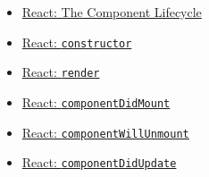 \begin{itemize}[leftmargin=*]
    \item \href{https://reactjs.org/docs/react-component.html#the-component-lifecycle}{React: The Component Lifecycle}
    \item \href{https://reactjs.org/docs/react-component.html#constructor}{React: \texttt{constructor}}
    \item \href{https://reactjs.org/docs/react-component.html#render}{React: \texttt{render}}
    \item \href{https://reactjs.org/docs/react-component.html#componentdidmount}{React: \texttt{componentDidMount}}
    \item \href{https://reactjs.org/docs/react-component.html#componentwillunmount}{React: \texttt{componentWillUnmount}}
    \item \href{https://reactjs.org/docs/react-component.html#componentdidupdate}{React: \texttt{componentDidUpdate}}
\end{itemize}
